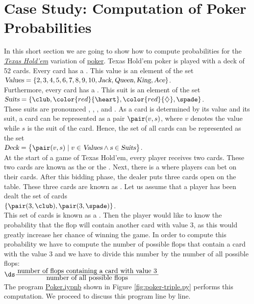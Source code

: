 \section{Case Study: Computation of Poker Probabilities}
In this short section we are going to show how to compute probabilities for the
\href{https://en.wikipedia.org/wiki/Texas_hold_%27em}{\textsl{Texas Hold'em}} variation of 
\href{https://en.wikipedia.org/wiki/Poker}{poker}.   Texas Hold'em poker is played with a deck of 52
cards.  Every card has a .  This value is an element of the set
\\[0.2cm]
\hspace*{1.3cm} 
$\textsl{Values} = \{ 2, 3, 4, 5, 6, 7, 8, 9, 10, \textsl{Jack}, \textsl{Queen}, \textsl{King}, \textsl{Ace} \}$.
\\[0.2cm]
Furthermore, every card has a .  This suit is an element of the set
\\[0.2cm]
\hspace*{1.3cm} 
$\textsl{Suits} = \{ \club, \mbox{$\color{red}{\heart}$}, \mbox{$\color{red}{\diamondsuit}$}, \spade \}$.
\\[0.2cm]
These suits are pronounced , , , and .
As a card is determined by its value and its suit, a card can be represented as a pair $\pair(v,s)$, where $v$
denotes the value while $s$ is the suit of the card.  Hence, the set of all cards can be represented as the set
\\[0.2cm]
\hspace*{1.3cm} 
$\textsl{Deck} = \bigl\{ \pair(v,s) \mid v \in \textsl{Values} \wedge \textsl{s} \in \textsl{Suits} \bigr\}$.
\\[0.2cm]
At the start of a game of Texas Hold'em, every player receives two cards.  These two cards are known
as the  or the .  Next, there is a  where players can bet on their
cards.   After this bidding phase, the dealer puts three cards open on the table.  These three cards are
known as .  Let us assume that a player has been dealt the set of cards
\\[0.2cm]
\hspace*{1.3cm}
$\{ \pair(3, \club), \pair(3, \spade) \}$.
\\[0.2cm]
This set of cards is known as a .  Then the player would like to know the probability
that the flop will contain another card with value $3$, as this would greatly increase her chance of
winning the game.  In order to compute this probability we have to compute the number of possible
flops that contain a card with the value $3$ and we have to divide this number by the number of all
possible flops:
\\[0.2cm]
\hspace*{1.3cm}
$\ds \frac{\;\mbox{number of flops containing a card with value $3$}\;}{\mbox{number of all possible flops}}$
\\[0.2cm]
The program
\href{https://github.com/karlstroetmann/Logic/blob/master/Python/Poker.ipynb}{Poker.iypnb}
shown in Figure \ref{fig:poker-triple.py} performs this computation.  We proceed to discuss this
program line by line.


